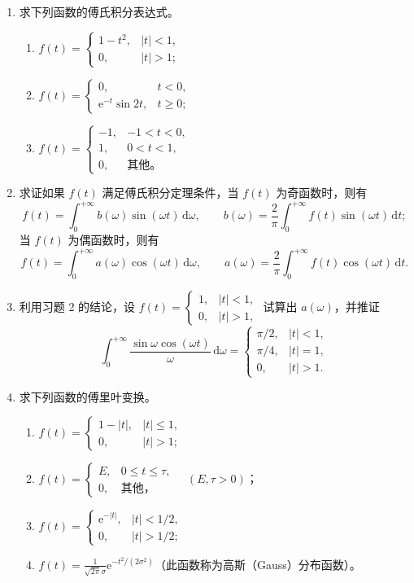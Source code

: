 \documentclass[UTF8,11pt,a4paper]{ctexart}
\newcommand{\dd}{\,\mathrm{d}}
\newcommand{\ee}{\mathrm{e}}
\begin{document}
\begin{enumerate}
\item 求下列函数的傅氏积分表达式。
  \begin{enumerate}
  \item $\displaystyle f(t)=\begin{cases}1-t^2,&|t|<1,\\0,&|t|>1;\end{cases}$
  \item $\displaystyle f(t)=\begin{cases}0,&t<0,\\\ee^{-t}\sin2t,&t\geqslant0;\end{cases}$
  \item $\displaystyle f(t)=\begin{cases}-1,&-1<t<0,\\1,&0<t<1,\\0,&\text{其他。}\end{cases}$
  \end{enumerate}

\item 求证如果 $f(t)$ 满足傅氏积分定理条件，当 $f(t)$ 为奇函数时，则有
\[
f(t)=\int_0^{+\infty}b(\omega)\sin(\omega t)\dd\omega,
\qquad b(\omega)=\frac2\pi\int_0^{+\infty}f(t)\sin(\omega t)\dd t;
\]
当 $f(t)$ 为偶函数时，则有
\[
f(t)=\int_0^{+\infty}a(\omega)\cos(\omega t)\dd\omega,
\qquad a(\omega)=\frac2\pi\int_0^{+\infty}f(t)\cos(\omega t)\dd t.
\]

\item 利用习题 2 的结论，设
$\displaystyle f(t)=\begin{cases}1,&|t|<1,\\0,&|t|>1,
\end{cases}$
试算出 $a(\omega)$，并推证
\[
\int_0^{+\infty}\frac{\sin\omega\cos(\omega t)}{\omega}\dd\omega
=\begin{cases}
\pi/2,&|t|<1,\\
\pi/4,&|t|=1,\\
0,&|t|>1.
\end{cases}
\]

\item 求下列函数的傅里叶变换。
  \begin{enumerate}
  \item $\displaystyle f(t)=\begin{cases}1-|t|,&|t|\leqslant1,\\0,&|t|>1;\end{cases}$
  \item $\displaystyle f(t)=\begin{cases}E,&0\leqslant t\leqslant\tau,\\0,&\text{其他，}\end{cases}\quad(E,\tau>0)$；
  \item $\displaystyle f(t)=\begin{cases}\ee^{-|t|},&|t|<1/2,\\0,&|t|>1/2;\end{cases}$
  \item $\displaystyle f(t)=\frac1{\sqrt{2\pi}\sigma}\ee^{-t^2/(2\sigma^2)}$（此函数称为高斯（Gauss）分布函数）。
  \end{enumerate}


\end{enumerate}
\end{document}
